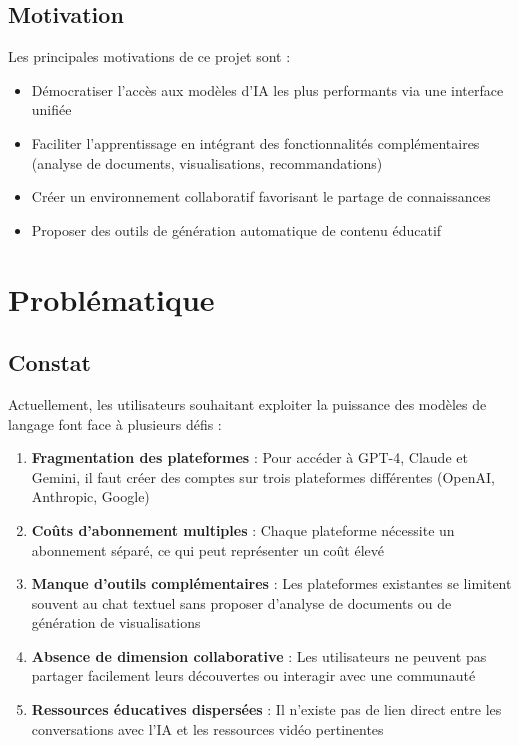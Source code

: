 \subsection{Motivation}

Les principales motivations de ce projet sont :

\begin{itemize}
    \item Démocratiser l'accès aux modèles d'IA les plus performants via une interface unifiée
    \item Faciliter l'apprentissage en intégrant des fonctionnalités complémentaires (analyse de documents, visualisations, recommandations)
    \item Créer un environnement collaboratif favorisant le partage de connaissances
    \item Proposer des outils de génération automatique de contenu éducatif
\end{itemize}

\section{Problématique}

\subsection{Constat}

Actuellement, les utilisateurs souhaitant exploiter la puissance des modèles de langage font face à plusieurs défis :

\begin{enumerate}
    \item \textbf{Fragmentation des plateformes} : Pour accéder à GPT-4, Claude et Gemini, il faut créer des comptes sur trois plateformes différentes (OpenAI, Anthropic, Google)
    \item \textbf{Coûts d'abonnement multiples} : Chaque plateforme nécessite un abonnement séparé, ce qui peut représenter un coût élevé
    \item \textbf{Manque d'outils complémentaires} : Les plateformes existantes se limitent souvent au chat textuel sans proposer d'analyse de documents ou de génération de visualisations
    \item \textbf{Absence de dimension collaborative} : Les utilisateurs ne peuvent pas partager facilement leurs découvertes ou interagir avec une communauté
    \item \textbf{Ressources éducatives dispersées} : Il n'existe pas de lien direct entre les conversations avec l'IA et les ressources vidéo pertinentes
\end{enumerate}

